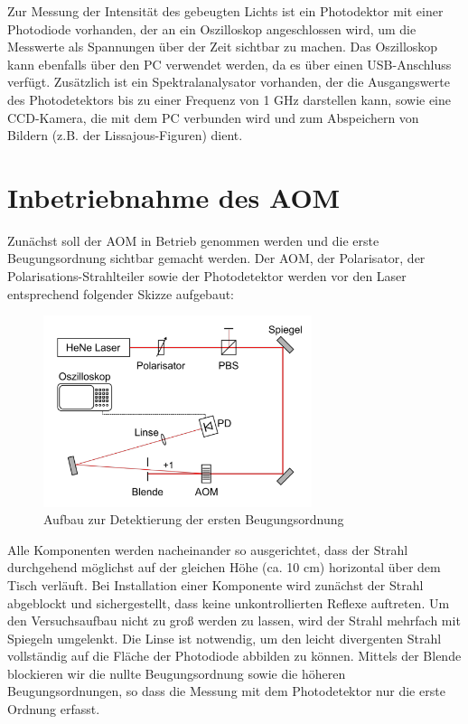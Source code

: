 \documentclass[bigchapter,colorback,accentcolor=tud4b,linedtoc,11pt]{tudreport}
\begin{document}
Zur Messung der Intensität des gebeugten Lichts ist ein Photodektor mit einer Photodiode vorhanden, der an ein Oszilloskop angeschlossen wird, um die Messwerte als Spannungen über der Zeit sichtbar zu machen. Das Oszilloskop kann ebenfalls über den PC verwendet werden, da es über einen USB-Anschluss verfügt. Zusätzlich ist ein Spektralanalysator vorhanden, der die Ausgangswerte des Photodetektors bis zu einer Frequenz von 1 GHz darstellen kann, sowie eine CCD-Kamera, die mit dem PC verbunden wird und zum Abspeichern von Bildern (z.B. der Lissajous-Figuren) dient.

\section{Inbetriebnahme des AOM}

Zunächst soll der AOM in Betrieb genommen werden und die erste Beugungsordnung sichtbar gemacht werden. Der AOM, der Polarisator, der Polarisations-Strahlteiler sowie der Photodetektor werden vor den Laser entsprechend folgender Skizze aufgebaut:

\begin{figure}[H] 
  \centering
     \includegraphics[width=0.7\textwidth]{data/inbetriebnahme.jpg}
  \caption[Cap for listoffigures]{Aufbau zur Detektierung der ersten Beugungsordnung \cite{Anleitung}}
  \label{fig:Bild1}
\end{figure}

Alle Komponenten werden nacheinander so ausgerichtet, dass der Strahl durchgehend möglichst auf der gleichen Höhe (ca. 10 cm) horizontal über dem Tisch verläuft. Bei Installation einer Komponente wird zunächst der Strahl abgeblockt und sichergestellt, dass keine unkontrollierten Reflexe auftreten. Um den Versuchsaufbau nicht zu groß werden zu lassen, wird der Strahl mehrfach mit Spiegeln umgelenkt. Die Linse ist notwendig, um den leicht divergenten Strahl vollständig auf die Fläche der Photodiode abbilden zu können. Mittels der Blende blockieren wir die nullte Beugungsordnung sowie die höheren Beugungsordnungen, so dass die Messung mit dem Photodetektor nur die erste Ordnung erfasst.
\end{document}
